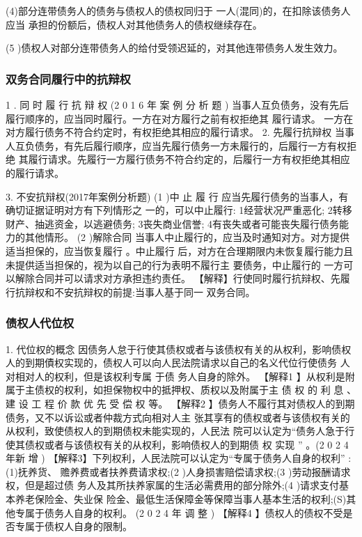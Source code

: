 \documentclass[UTF8,12pt]{ctexart}
\numberwithin{equation}{section} %
\numberwithin{figure}{section}
\numberwithin{table}{section}
\begin{document}
	(4)部分连带债务人的债务与债权人的债权同归于 一人(混同)的，在扣除该债务人应当 承担的份额后，债权人对其他债务人的债权继续存在。
	
	(5 )债权人对部分连带债务人的给付受领迟延的，对其他连带债务人发生效力。
	
	\subsubsection{双务合同履行中的抗辩权}
	1 . 同 时 履 行 抗 辩 权 (2 0 1 6 年 案 例 分 析 题 ) 当事人互负债务，没有先后履行顺序的，应当同时履行。一方在对方履行之前有权拒绝其 履行请求。 一方在对方履行债务不符合约定时，有权拒绝其相应的履行请求。
	2. 先履行抗辩权 当事人互负债务，有先后履行顺序，应当先履行债务一方未履行的，后履行一方有权拒绝 其履行请求。先履行一方履行债务不符合约定的，后履行一方有权拒绝其相应的履行请求。
	
	
	3. 不安抗辩权(2017年案例分析题)
	(1 )中 止 履 行
	应当先履行债务的当事人，有确切证据证明对方有下列情形之 一的，可以中止履行: 1经营状况严重恶化;
	2转移财产、抽逃资金，以逃避债务;
	3丧失商业信誉;
	4有丧失或者可能丧失履行债务能力的其他情形。
	(2 )解除合同 当事人中止履行的，应当及时通知对方。对方提供适当担保的，应当恢复履行 。中止履行 后，对方在合理期限内未恢复履行能力且未提供适当担保的，视为以自己的行为表明不履行主 要债务，中止履行的 一方可以解除合同并可以请求对方承担违约责任。
	【解释】行使同时履行抗辩权、先履行抗辩权和不安抗辩权的前提:当事人基于同一 双务合同。
	
	\subsubsection{债权人代位权}
	1. 代位权的概念 因债务人怠于行使其债权或者与该债权有关的从权利，影响债权人的到期債权实现的，债权人可以向人民法院请求以自己的名义代位行使债务 人对相对人的权利，但是该权利专属 于债 务人自身的除外。
	【解释1 】从权利是附属于主债权的权利，如担保物权中的抵押权、质权以及附属于主 债 权 的 利 息 、 建 设 工 程 价 款 优 先 受 偿 权 等。
	【解释2 】债务人不履行其对债权人的到期债务，又不以诉讼或者仲裁方式向相对人主 张其享有的债权或者与该债权有关的从权利，致使债权人的到期债权未能实现的，人民法 院可以认定为“债务人急于行使其债权或者与该债权有关的从权利，影响债权人的到期债 权 实现 ” 。(2 0 2 4 年新 增 ) 【解释3】下列权利，人民法院可以认定为“专属于债务人自身的权利” :(1)抚养货、 赡养费或者扶养费请求权;(2 )人身损害赔偿请求权;(3 )劳动报酬请求权，但是超过债 务人及其所扶养家属的生活必需费用的部分除外;(4 )请求支付基本养老保险金、失业保 险金、最低生活保障金等保障当事人基本生活的权利;(S)其他专属于债务人自身的权利。 (2 0 2 4 年 调 整 )
	【解释4 】债权人的债权不受是否专属于债权人自身的限制。
	
\end{document}
